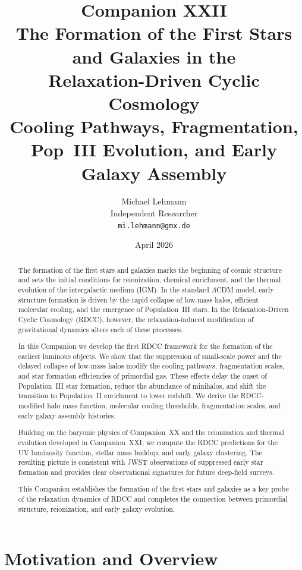 \documentclass[11pt,a4paper]{article}
\title{
\textbf{Companion XXII}\\[4mm]
\textbf{The Formation of the First Stars and Galaxies in the}\\
\textbf{Relaxation-Driven Cyclic Cosmology}\\[2mm]
\textbf{Cooling Pathways, Fragmentation, Pop~III Evolution, and Early Galaxy Assembly}
}
\author{
Michael Lehmann\\
Independent Researcher\\
\texttt{mi.lehmann@gmx.de}
}
\date{April 2026}
\begin{document}
\maketitle

\begin{abstract}
The formation of the first stars and galaxies marks the beginning of cosmic structure and 
sets the initial conditions for reionization, chemical enrichment, and the thermal evolution 
of the intergalactic medium (IGM). In the standard $\Lambda$CDM model, early structure 
formation is driven by the rapid collapse of low-mass halos, efficient molecular cooling, and 
the emergence of Population~III stars. In the Relaxation-Driven Cyclic Cosmology (RDCC), 
however, the relaxation-induced modification of gravitational dynamics alters each of these 
processes.

In this Companion we develop the first RDCC framework for the formation of the earliest 
luminous objects. We show that the suppression of small-scale power and the delayed collapse 
of low-mass halos modify the cooling pathways, fragmentation scales, and star formation 
efficiencies of primordial gas. These effects delay the onset of Population~III star 
formation, reduce the abundance of minihalos, and shift the transition to Population~II 
enrichment to lower redshift. We derive the RDCC-modified halo mass function, molecular 
cooling thresholds, fragmentation scales, and early galaxy assembly histories.

Building on the baryonic physics of Companion~XX and the reionization and thermal evolution 
developed in Companion~XXI, we compute the RDCC predictions for the UV luminosity function, 
stellar mass buildup, and early galaxy clustering. The resulting picture is consistent with 
JWST observations of suppressed early star formation and provides clear observational 
signatures for future deep-field surveys.

This Companion establishes the formation of the first stars and galaxies as a key probe of 
the relaxation dynamics of RDCC and completes the connection between primordial structure, 
reionization, and early galaxy evolution.
\end{abstract}

\section{Motivation and Overview}
\end{document}
